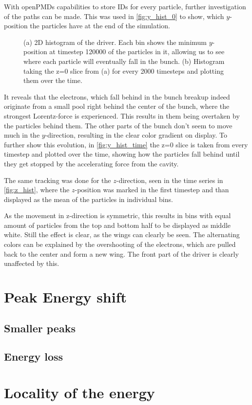 \documentclass[bachelor_thesis]{subfiles}
\begin{document}
With openPMDs capabilities to store IDs for every particle, further investigation of the paths can be made. This was used in \autoref{fig:y_hist_0} to show, which $y$-position the particles have at the end of the simulation.
\begin{figure}
	\centering
	\begin{subfigure}{0.5\textwidth}
	\centering
	\missingfigure{}
	\caption{} \label{fig:y_hist_0}
	\end{subfigure}
	\hfill
	\begin{subfigure}{0.5\textwidth}
	\centering
	\missingfigure{}
	\caption{} \label{fig:y_hist_time}
	\end{subfigure}
	\caption{(a) 2D histogram of the driver. Each bin shows the minimum $y$-position at timestep \num{120000} of the particles in it, allowing us to see where each particle will eventually fall in the bunch.
	(b) Histogram taking the z=0 slice from (a) for every 2000 timesteps and plotting them over the time.}
	\label{fig:y_hist}
\end{figure} 
It reveals that the electrons, which fall behind in the bunch breakup indeed originate from a small pool right behind the center of the bunch, where the strongest Lorentz-force is experienced. This results in them being overtaken by the particles behind them.
The other parts of the bunch don't seem to move much in the $y$-direction, resulting in the clear color gradient on display. To further show this evolution, in \autoref{fig:y_hist_time} the z=0 slice is taken from every timestep and plotted over the time,
showing how the particles fall behind until they get stopped by the accelerating force from the cavity.

The same tracking was done for the $z$-direction, seen in the time series in \autoref{fig:z_hist}, where the $z$-position was marked in the first timestep and than displayed as the mean of the particles in individual bins.
\begin{figure}
	\centering
	\missingfigure{}
	\caption{}
	\label{fig:z_hist}
\end{figure}
As the movement in z-direction is symmetric, this results in bins with equal amount of particles from the top and bottom half to be displayed as middle white. Still the effect is clear, as the wings can clearly be seen.
The alternating colors can be explained by the overshooting of the electrons, which are pulled back to the center and form a new wing. The front part of the driver is clearly unaffected by this.

\section{Peak Energy shift}

\subsection{Smaller peaks}
\subsection{Energy loss}

\section{Locality of the energy}\label{chap:loc_E}
\end{document}
